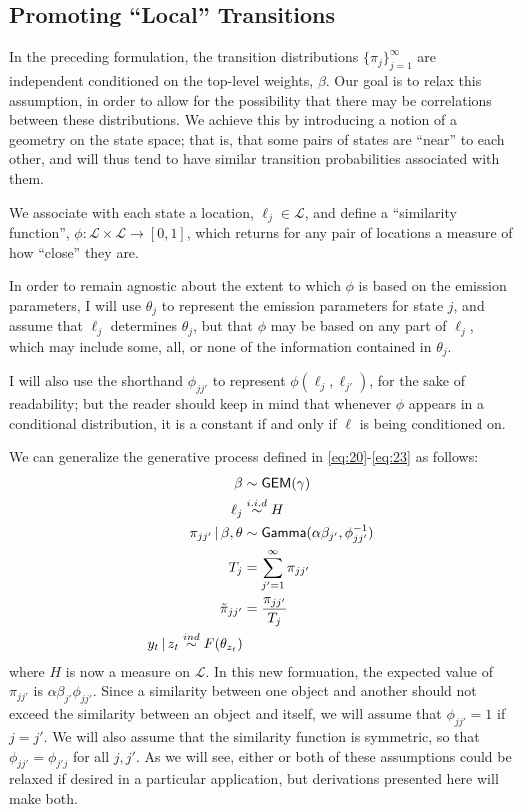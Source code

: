 \subsection{Promoting ``Local'' Transitions}
\label{sec:prom-local-trans}

In the preceding formulation, the transition distributions
$\{\pi_{j}\}_{j=1}^\infty$ are independent conditioned on the
top-level weights, $\beta$.  Our goal is to relax this assumption, in
order to allow for the possibility that there may be correlations
between these distributions.  We achieve this by introducing a notion
of a geometry on the state space; that is, that some pairs of states
are ``near'' to each other, and will thus tend to have similar
transition probabilities associated with them.

We associate with each state a location, $\ell_j \in \mathcal{L}$, and
define a ``similarity function'', $\phi: \mathcal{L} \times
\mathcal{L} \to [0,1]$, which returns for any pair of locations a
measure of how ``close'' they are.  

In order to remain agnostic about the extent to which $\phi$ is based
on the emission parameters, I will use $\theta_j$ to represent the
emission parameters for state $j$, and assume that $\ell_j$ determines
$\theta_j$, but that $\phi$ may be based on any part of $\ell_j$,
which may include some, all, or none of the information contained in
$\theta_j$.

I will also use the shorthand $\phi_{jj'}$ to represent $\phi(\ell_j,
\ell_{j'})$, for the sake of readability; but the reader should keep
in mind that whenever $\phi$ appears in a conditional distribution, it
is a constant if and only if $\ell$ is being conditioned on.

We can generalize the generative process defined in
\eqref{eq:20}-\eqref{eq:23} as follows:
\begin{align} \beta &\sim \mathsf{GEM}(\gamma) \\ \ell_j
&\stackrel{i.i.d}{\sim} H \\ \pi_{jj'} \, \vert \, \beta, \theta &\sim
\mathsf{Gamma}(\alpha \beta_{j'},\phi_{jj'}^{-1}) \\ T_j &=
\sum_{j'=1}^{\infty} \pi_{jj'} \\ \tilde{\pi}_{jj'} &=
\frac{\pi_{jj'}}{T_j} \\ y_t \, \vert \, z_t \stackrel{ind}{\sim}
F(\theta_{z_t})
\end{align} where $H$ is now a measure on $\mathcal{L}$.  In this new
formuation, the expected value of $\pi_{jj'}$ is
$\alpha\beta_{j'}\phi_{jj'}$.  Since a similarity between one object
and another should not exceed the similarity between an object and
itself, we will assume that $\phi_{jj'} = 1$ if $j = j'$.  We will
also assume that the similarity function is symmetric, so that
$\phi_{jj'} = \phi_{j'j}$ for all $j,j'$.  As we will see, either or
both of these assumptions could be relaxed if desired in a particular
application, but derivations presented here will make both.

